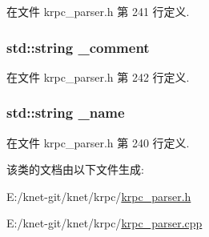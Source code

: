 在文件 krpc\+\_\+parser.\+h 第 241 行定义.

\hypertarget{classkrpc__rpc__call__t_a8023a5250068c80d006205154d89046f}{}
\subsubsection[{\+\_\+comment}]{\setlength{\rightskip}{0pt plus 5cm}std\+::string \+\_\+comment\hspace{0.3cm}{\ttfamily [private]}}\label{classkrpc__rpc__call__t_a8023a5250068c80d006205154d89046f}


在文件 krpc\+\_\+parser.\+h 第 242 行定义.

\hypertarget{classkrpc__rpc__call__t_aaf2ed934b37cbbd236fdd1b01a5f5005}{}
\subsubsection[{\+\_\+name}]{\setlength{\rightskip}{0pt plus 5cm}std\+::string \+\_\+name\hspace{0.3cm}{\ttfamily [private]}}\label{classkrpc__rpc__call__t_aaf2ed934b37cbbd236fdd1b01a5f5005}


在文件 krpc\+\_\+parser.\+h 第 240 行定义.



该类的文档由以下文件生成\+:\begin{DoxyCompactItemize}
\item 
E\+:/knet-\/git/knet/krpc/\hyperlink{krpc__parser_8h}{krpc\+\_\+parser.\+h}\item 
E\+:/knet-\/git/knet/krpc/\hyperlink{krpc__parser_8cpp}{krpc\+\_\+parser.\+cpp}\end{DoxyCompactItemize}
